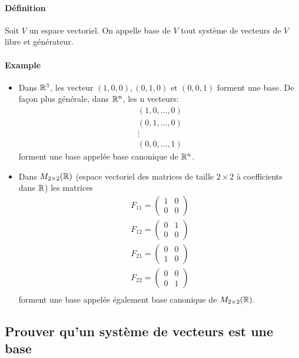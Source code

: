 \paragraph{Définition} Soit $V$ un espace vectoriel. On appelle base de $V$ tout système de vecteurs de $V$ libre et générateur.

\paragraph{Example}
\begin{itemize}
  \item Dans $\mathbb{R}^3$, les vecteur $(1, 0, 0), (0, 1, 0) \text{ et } (0, 0, 1)$ forment une base.  De façon plus générale, dans $\mathbb{R}^n$, les n vecteurs:
    \begin{eqnarray*}
      (1, 0, \ldots, 0) \\
      (0, 1, \ldots, 0) \\
      \vdots \\
      (0, 0, \ldots, 1) 
    \end{eqnarray*}
    forment une base appelée base canonique de $\mathbb{R}^n$.
  \item Dans $M_{2\times 2}(\mathbb{R})$ (espace vectoriel des matrices de taille $2\times 2$ à coefficients dans $\mathbb{R}$) les matrices 
    \begin{eqnarray*}
      F_{11} = \begin{pmatrix} 1 & 0 \\ 0 & 0 \end{pmatrix} \\
      F_{12} = \begin{pmatrix} 0 & 1 \\ 0 & 0 \end{pmatrix} \\
      F_{21} = \begin{pmatrix} 0 & 0 \\ 1 & 0 \end{pmatrix} \\
      F_{22} = \begin{pmatrix} 0 & 0 \\ 0 & 1 \end{pmatrix} \\
    \end{eqnarray*}
    forment une base appelée également base canonique de $M_{2 \times 2}(\mathbb{R})$.
\end{itemize}

%
\subsection{Prouver qu'un système de vecteurs est une base}
%
